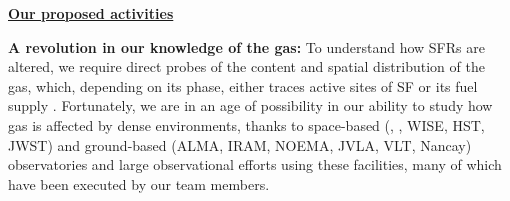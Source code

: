 \documentclass[11pt]{article}
\begin{document}

\centerline{{\bf \underline{ Our proposed activities}}}

\textbf{A revolution in our knowledge of the gas:} To understand how SFRs are altered, we require direct probes of the content and spatial distribution of the gas, which, depending on its phase, either traces active sites of SF or its fuel supply  \citep[e.g.][]{Kennicutt98b,Bigiel08,Leroy08}.  Fortunately, we are in an age of possibility in our ability to study how gas is affected by dense environments, thanks to space-based (\spitzer, \herschel, WISE, HST, JWST) and ground-based (ALMA, IRAM, NOEMA, JVLA, VLT, Nancay) observatories and large observational efforts using these facilities, many of which have been executed by our team members.
\end{document}

